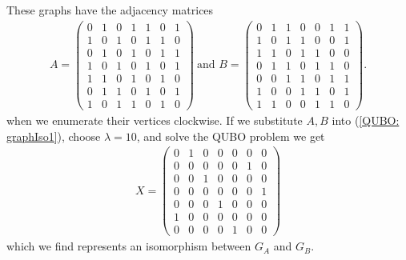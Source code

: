\documentclass{article}
\begin{document}
\noindent These graphs have the adjacency matrices
\begin{align*}
    A = \begin{pmatrix}
        0 & 1 & 0 & 1 & 1 & 0 & 1 \\
        1 & 0 & 1 & 0 & 1 & 1 & 0 \\
        0 & 1 & 0 & 1 & 0 & 1 & 1 \\
        1 & 0 & 1 & 0 & 1 & 0 & 1 \\
        1 & 1 & 0 & 1 & 0 & 1 & 0 \\
        0 & 1 & 1 & 0 & 1 & 0 & 1 \\
        1 & 0 & 1 & 1 & 0 & 1 & 0
    \end{pmatrix} \: \text{and }
    B = \begin{pmatrix}
        0 & 1 & 1 & 0 & 0 & 1 & 1 \\
        1 & 0 & 1 & 1 & 0 & 0 & 1 \\
        1 & 1 & 0 & 1 & 1 & 0 & 0 \\
        0 & 1 & 1 & 0 & 1 & 1 & 0 \\
        0 & 0 & 1 & 1 & 0 & 1 & 1 \\
        1 & 0 & 0 & 1 & 1 & 0 & 1 \\
        1 & 1 & 0 & 0 & 1 & 1 & 0
    \end{pmatrix}.
\end{align*}
when we enumerate their vertices clockwise. If we substitute \(A, B\) into (\ref{QUBO: graphIso1}), choose \(\lambda = 10\), and solve the QUBO problem we get
\begin{align*}
    X = \begin{pmatrix}
        0 & 1 & 0 & 0 & 0 & 0 & 0 \\
        0 & 0 & 0 & 0 & 0 & 1 & 0 \\
        0 & 0 & 1 & 0 & 0 & 0 & 0 \\
        0 & 0 & 0 & 0 & 0 & 0 & 1 \\
        0 & 0 & 0 & 1 & 0 & 0 & 0 \\
        1 & 0 & 0 & 0 & 0 & 0 & 0 \\
        0 & 0 & 0 & 0 & 1 & 0 & 0
    \end{pmatrix}
\end{align*}
which we find represents an isomorphism between \(G_A\) and \(G_B\).\\
\end{document}
